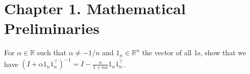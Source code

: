 \section*{Chapter 1. Mathematical Preliminaries}

\begin{exercise}[1.1]
For $\alpha \in \mathbb{R}$ such that $\alpha \ne -1/n$ and $1_n \in \mathbb{R}^n$ the vector of all 1s, show that
we have $(I+\alpha 1_n 1_n^{\top})^{-1} = I - \frac{\alpha}{1+n\alpha}1_n 1_n^{\top}$.
\end{exercise}

\begin{tcolorbox}[breakable, title=Solution]
    
\end{tcolorbox}


